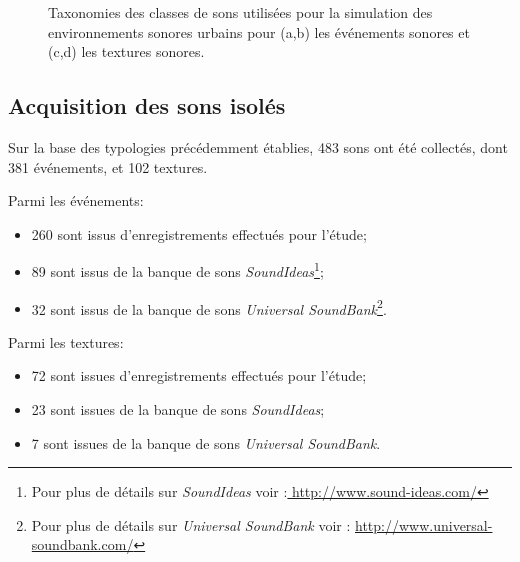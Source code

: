 \begin{figure}[t]
       \caption[Taxonomies des classes de sons utilisées pour la simulation des environnements sonores urbains.]{Taxonomies des classes de sons utilisées pour la simulation des environnements sonores urbains pour (a,b) les événements sonores et (c,d) les textures sonores.}\label{fig:taxonomie}
\end{figure}

\subsection{Acquisition des sons isolés}
\label{sec:ch5_recordDataSet}

Sur la base des typologies précédemment établies, 483 sons ont été collectés, dont 381 événements, et 102 textures.

Parmi les événements:

\begin{itemize}
\item 260 sont issus d’enregistrements effectués pour l'étude;
\item 89 sont issus de la banque de sons \emph{SoundIdeas}\footnote{Pour plus de détails sur \emph{SoundIdeas} voir :\url{ http://www.sound-ideas.com/}};
\item 32 sont issus de la banque de sons \emph{Universal SoundBank}\footnote{Pour plus de détails sur \emph{Universal SoundBank} voir : \url{http://www.universal-soundbank.com/}}.
\end{itemize}

Parmi les textures:

\begin{itemize}
\item 72 sont issues d’enregistrements effectués pour l'étude;
\item 23 sont issues de la banque de sons \emph{SoundIdeas};
\item 7 sont issues de la banque de sons \emph{Universal SoundBank}.
\end{itemize}

